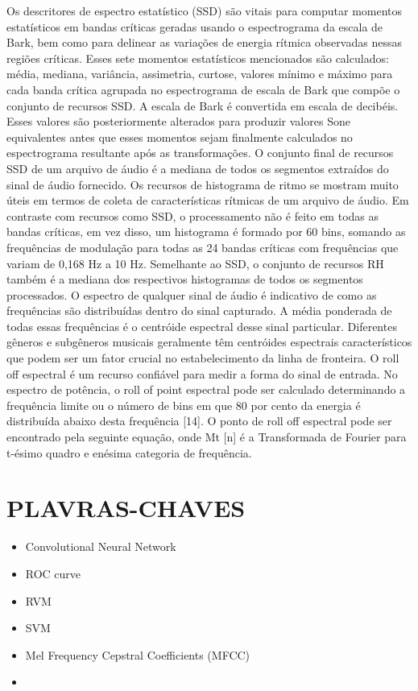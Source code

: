 \documentclass{article}
\begin{document}
Os descritores de espectro estatístico (SSD) são vitais para computar momentos estatísticos em bandas críticas geradas usando o espectrograma da escala de Bark, bem como para delinear as variações de energia rítmica observadas nessas regiões críticas. Esses sete momentos estatísticos mencionados são calculados: média, mediana, variância, assimetria, curtose, valores mínimo e máximo para cada banda crítica agrupada no espectrograma de escala de Bark que compõe o conjunto de recursos SSD. A escala de Bark é convertida em escala de decibéis. Esses valores são posteriormente alterados para produzir valores Sone equivalentes antes que esses momentos sejam finalmente calculados no espectrograma resultante após as transformações. O conjunto final de recursos SSD de um arquivo de áudio é a mediana de todos os segmentos extraídos do sinal de áudio fornecido.
Os recursos de histograma de ritmo se mostram muito úteis em termos de coleta de características rítmicas de um arquivo de áudio. Em contraste com recursos como SSD, o processamento não é feito em todas as bandas críticas, em vez disso, um histograma é formado por 60 bins, somando as frequências de modulação para todas as 24 bandas críticas com frequências que variam de 0,168 Hz a 10 Hz. Semelhante ao SSD, o conjunto de recursos RH também é a mediana dos respectivos histogramas de todos os segmentos processados.
O espectro de qualquer sinal de áudio é indicativo de como as frequências são distribuídas dentro do sinal capturado. A média ponderada de todas essas frequências é o centróide espectral desse sinal particular. Diferentes gêneros e subgêneros musicais geralmente têm centróides espectrais característicos que podem ser um fator crucial no estabelecimento da linha de fronteira.
O roll off espectral é um recurso confiável para medir a forma do sinal de entrada. No espectro de potência, o roll of point espectral pode ser calculado determinando a frequência limite ou o número de bins em que 80 por cento da energia é distribuída abaixo desta frequência [14]. O ponto de roll off espectral pode ser encontrado pela seguinte equação, onde Mt [n] é a Transformada de Fourier para t-ésimo quadro e enésima categoria de frequência.

\section{PLAVRAS-CHAVES}
\begin{itemize}
    \item Convolutional Neural Network
    \item ROC curve
    \item RVM
    \item SVM
    \item Mel Frequency Cepstral Coefficients (MFCC)
    \item 
\end{itemize}
\end{document}
